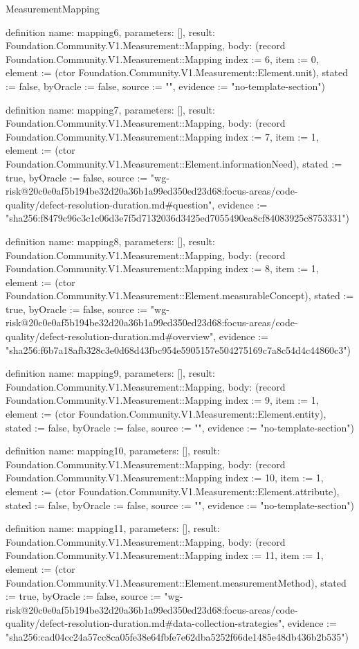 \begin{lexlean}{MeasurementMapping}
\begin{semanticmodule}
definition{
  name: mapping6,
  parameters: [],
  result: Foundation.Community.V1.Measurement::Mapping,
  body: (record Foundation.Community.V1.Measurement::Mapping {index := 6, item := 0, element := (ctor Foundation.Community.V1.Measurement::Element.unit), stated := false, byOracle := false, source := "", evidence := "no-template-section"})
}

definition{
  name: mapping7,
  parameters: [],
  result: Foundation.Community.V1.Measurement::Mapping,
  body: (record Foundation.Community.V1.Measurement::Mapping {index := 7, item := 1, element := (ctor Foundation.Community.V1.Measurement::Element.informationNeed), stated := true, byOracle := false, source := "wg-risk@20c0e0af5b194be32d20a36b1a99ed350ed23d68:focus-areas/code-quality/defect-resolution-duration.md#question", evidence := "sha256:f8479c96c3c1c06d3e7f5d7132036d3425ed7055490ea8cf84083925c8753331"})
}

definition{
  name: mapping8,
  parameters: [],
  result: Foundation.Community.V1.Measurement::Mapping,
  body: (record Foundation.Community.V1.Measurement::Mapping {index := 8, item := 1, element := (ctor Foundation.Community.V1.Measurement::Element.measurableConcept), stated := true, byOracle := false, source := "wg-risk@20c0e0af5b194be32d20a36b1a99ed350ed23d68:focus-areas/code-quality/defect-resolution-duration.md#overview", evidence := "sha256:f6b7a18afb328c3e0d68d43fbc954e5905157e504275169c7a8c54d4c44860c3"})
}

definition{
  name: mapping9,
  parameters: [],
  result: Foundation.Community.V1.Measurement::Mapping,
  body: (record Foundation.Community.V1.Measurement::Mapping {index := 9, item := 1, element := (ctor Foundation.Community.V1.Measurement::Element.entity), stated := false, byOracle := false, source := "", evidence := "no-template-section"})
}

definition{
  name: mapping10,
  parameters: [],
  result: Foundation.Community.V1.Measurement::Mapping,
  body: (record Foundation.Community.V1.Measurement::Mapping {index := 10, item := 1, element := (ctor Foundation.Community.V1.Measurement::Element.attribute), stated := false, byOracle := false, source := "", evidence := "no-template-section"})
}

definition{
  name: mapping11,
  parameters: [],
  result: Foundation.Community.V1.Measurement::Mapping,
  body: (record Foundation.Community.V1.Measurement::Mapping {index := 11, item := 1, element := (ctor Foundation.Community.V1.Measurement::Element.measurementMethod), stated := true, byOracle := false, source := "wg-risk@20c0e0af5b194be32d20a36b1a99ed350ed23d68:focus-areas/code-quality/defect-resolution-duration.md#data-collection-strategies", evidence := "sha256:cad04cc24a57cc8ca05fe38e64fbfe7e62dba5252f66de1485e48db436b2b535"})
}


\end{semanticmodule}
\end{lexlean}
